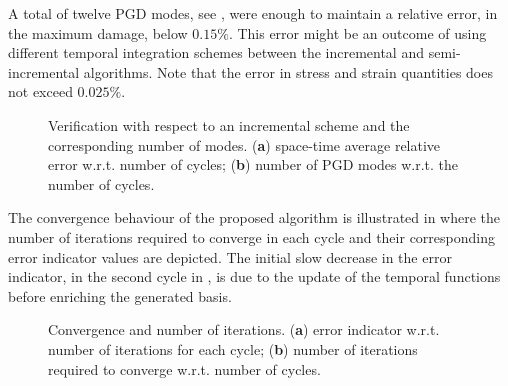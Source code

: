 A total of twelve PGD modes, see , were enough to maintain a relative error, in the maximum damage, below $0.15\%$. This error might be an outcome of using different temporal integration schemes between the incremental and semi-incremental algorithms. Note that the error in stress and strain quantities does not exceed $0.025\%$.
\begin{figure}[hbt!]
	\centering
	\begin{subfigure}[]{0.49\linewidth}
		
		\caption{}
		\label{fig_ver_bochner}
	\end{subfigure}
	\hfil
	\begin{subfigure}[]{0.49\linewidth}
		
		\caption{}
		\label{fig_ver_pgdmodes}
	\end{subfigure}
	\caption{Verification with respect to an incremental scheme and the corresponding number of modes. (\textbf{a}) space-time average relative error w.r.t. number of cycles; (\textbf{b}) number of PGD modes w.r.t. the number of cycles.}
\end{figure}

The convergence behaviour of the proposed algorithm is illustrated in  where the number of iterations required to converge in each cycle and their corresponding error indicator values are depicted. The initial slow decrease in the error indicator, in the second cycle in , is due to the update of the temporal functions before enriching the generated basis.
\begin{figure}[hbt!]
	\centering
	\begin{subfigure}[]{0.49\linewidth}
		
		\caption{}
		\label{fig_ver_vergence}
	\end{subfigure}
	\hfil
	\begin{subfigure}[]{0.49\linewidth}
		
		\caption{}
	\end{subfigure}
	\caption{Convergence and number of iterations. (\textbf{a}) error indicator w.r.t. number of iterations for each cycle; (\textbf{b}) number of iterations required to converge w.r.t. number of cycles.
	}
\end{figure}

